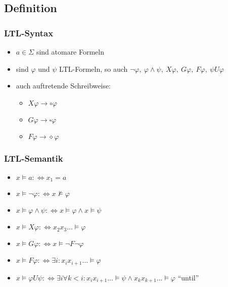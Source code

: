     \subsection{Definition}
        \subsubsection{LTL-Syntax}
            \begin{itemize}
                \item $a\in\Sigma$ sind atomare Formeln
                \item sind $\varphi$ und $\psi$ LTL-Formeln, so auch $\neg\varphi,\ \varphi\wedge\psi,\ X\varphi,\ G\varphi,\ F\varphi,\ \psi U\varphi$
                \item auch auftretende Schreibweise:\\
                    \begin{itemize}
                        \item $X\varphi\rightarrow\circ\varphi$
                        \item $G\varphi\rightarrow\square\varphi$
                        \item $F\varphi\rightarrow\diamond\varphi$
                    \end{itemize}
            \end{itemize}
        \subsubsection{LTL-Semantik}
            \begin{itemize}
                \item $x\models a:\Leftrightarrow x_1=a$
                \item $x\models \neg\varphi:\Leftrightarrow x\not\models\varphi$
                \item $x\models \varphi\wedge\psi:\Leftrightarrow x\models\varphi\wedge x\models\psi$
                \item $x\models X\varphi:\Leftrightarrow x_2x_3\dots\models\varphi$
                \item $x\models G\varphi:\Leftrightarrow x\models\neg F\neg\varphi$
                \item $x\models F\varphi:\Leftrightarrow \exists i:x_ix_{i+1}\dots\models\varphi$
                \item $x\models \varphi U\psi:\Leftrightarrow\exists i\forall k<i: x_ix_{i+1}\dots\models\psi\wedge x_kx_{k+1}\dots\models\varphi$ ``until''
            \end{itemize}
